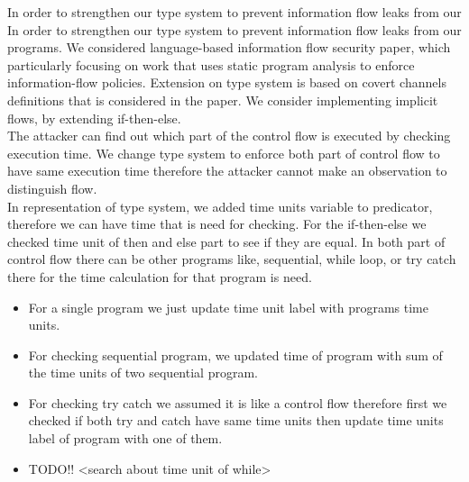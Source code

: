 \documentclass[../extensions.tex]{subfiles}
\begin{document}
In order to strengthen our type system to prevent information flow leaks from our 
In order to strengthen our type system to prevent information flow leaks from our programs. We considered language-based information flow security paper, which particularly focusing on work that uses static program analysis to enforce information-flow policies. Extension on type system is based on covert channels definitions that is considered in the paper. We consider implementing implicit flows, by extending if-then-else.
\newline
\\
The attacker can find out which part of the control flow is executed by checking execution time. We change type system to enforce both part of control flow to have same execution time therefore the attacker cannot make an observation to distinguish flow.
\newline
\\
In representation of type system, we added time units variable to predicator, therefore we can have time that is need for checking. For the if-then-else we checked time unit of then and else part to see if they are equal. In both part of control flow there can be other programs like, sequential, while loop, or try catch there for the time calculation for that program is need.  
\begin{itemize}
	\item For a single program we just update time unit label with programs time units.
	\item For checking sequential program, we updated time of program with sum of the time units of two sequential program.
	\item For checking try catch we assumed it is like a control flow therefore first we checked if both try and catch have same time units then update time units label of program with one of them.  
	\item TODO!! <search about time unit of while>
\end{itemize}
\end{document}

